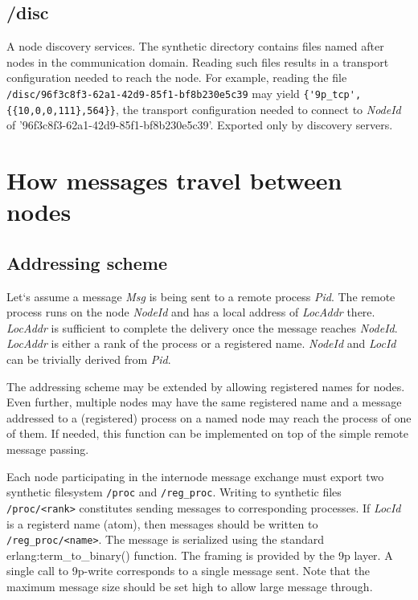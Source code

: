 \documentclass{scrartcl}
\begin{document}
\subsection*{/disc}

A node discovery services. The synthetic directory contains files named after
nodes in the communication domain. Reading such files results in a transport
configuration needed to reach the node. For example, reading the file
\verb$/disc/96f3c8f3-62a1-42d9-85f1-bf8b230e5c39$ may yield
\verb${'9p_tcp',{{10,0,0,111},564}}$, the transport configuration needed to
connect to \emph{NodeId} of '96f3c8f3-62a1-42d9-85f1-bf8b230e5c39'. Exported
only by discovery servers.

\section*{How messages travel between nodes}

\subsection*{Addressing scheme}

Let`s assume a message \emph{Msg} is being sent to a remote process \emph{Pid}.
The remote process runs on the node \emph{NodeId} and has a local address of
\emph{LocAddr} there. \emph{LocAddr} is sufficient to complete the delivery once
the message reaches \emph{NodeId}. \emph{LocAddr} is either a rank of the
process or a registered name. \emph{NodeId} and \emph{LocId} can be trivially
derived from \emph{Pid}.

The addressing scheme may be extended by allowing registered names for nodes.
Even further, multiple nodes may have the same registered name and a message
addressed to a (registered) process on a named node may reach the process of one
of them. If needed, this function can be implemented on top of the simple remote
message passing.

Each node participating in the internode message exchange must export two
synthetic filesystem \verb$/proc$ and \verb$/reg_proc$. Writing to synthetic files
\verb$/proc/<rank>$ constitutes sending messages to corresponding processes. If
\emph{LocId} is a registerd name (atom), then messages should be written to
\verb$/reg_proc/<name>$. The message is serialized using the standard
erlang:term\_to\_binary() function. The framing is provided by the 9p layer. A
single call to 9p-write corresponds to a single message sent. Note that the
maximum message size should be set high to allow large message through.
\end{document}

